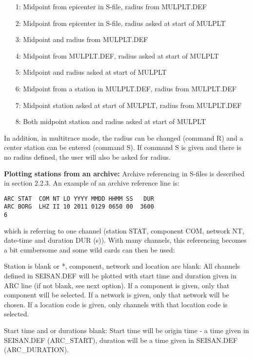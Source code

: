 \begin{enumerate}
\item[1:]
Midpoint from epicenter in S-file, radius from MULPLT.DEF
\item[2:]
Midpoint from epicenter in S-file, radius asked at start of MULPLT
\item[3:]
Midpoint and radius from MULPLT.DEF
\item[4:]
Midpoint  from MULPLT.DEF, radius asked at start of MULPLT
\item[5:]
Midpoint and radius asked at start of MULPLT
\item[6:]
Midpoint from a station in MULPLT.DEF, radius from MULPLT.DEF
\item[7:]
Midpoint station asked at start of MULPLT, radius from MULPLT.DEF
\item[8:]
Both midpoint station and radius asked at start of MULPLT
\end{enumerate}

In addition, in multitrace mode, the radius can be changed (command R) and a center station can be entered (command S). If command S is given and there is no radius defined, the user will also be asked for radius.

\textbf{Plotting stations from an archive:} Archive referencing in S-files is described in section 2.2.3. An example of an archive reference line is:

\begin{verbatim}
ARC STAT  COM NT LO YYYY MMDD HHMM SS   DUR
ARC BORG  LHZ II 10 2011 0129 0650 00  3600                                   6
\end{verbatim}

which is referring to one channel (station STAT, component COM, network NT, date-time and duration DUR (s)). With many channels, this referencing becomes a bit cumbersome and some wild cards can then be used:

Station is blank or *, component, network and location are blank: All channels defined in SEISAN.DEF will be plotted with start time and duration given in ARC line (if not blank, see next option). If a component is given, only that component will be selected. If a network is given, only that network will be chosen. If a location code is given, only channels with that location code is selected.

Start time and or durations blank: Start time will be origin time - a time given in SEISAN.DEF (ARC\_START), duration will be a time given in SEISAN.DEF (ARC\_DURATION).

